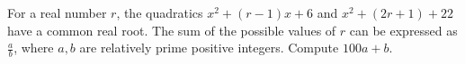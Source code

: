 For a real number $r$, the quadratics $x^2 + (r-1)x + 6$ and $x^2 + (2r + 1) + 22$ have a common real root. The sum of the possible values of $r$ can be expressed as $\frac{a}{b}$, where $a, b$ are relatively prime positive integers. Compute $100a + b$.
